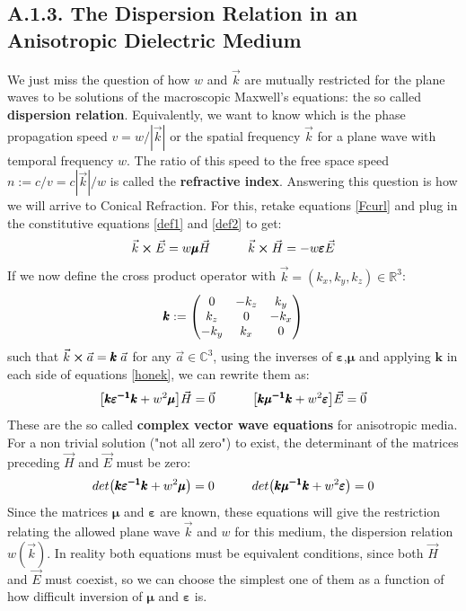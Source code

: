 \documentclass[11pt, a4paper, twoside]{article} %
\newcommand{\R}{\mathbb{R}} %
\newcommand{\C}{\mathbb{C}}
\begin{document}
\subsection*{A.1.3. The Dispersion Relation in an Anisotropic Dielectric Medium\vspace{-0.2cm}}
We just miss the question of how $w$ and $\vec{k}$ are mutually restricted for the plane waves to be solutions of the macroscopic Maxwell's equations: the so called {\bf dispersion relation}. Equivalently, we want to know which is the phase propagation speed $v=w/|\vec{k}|$ or the spatial frequency $\vec{k}$ for a plane wave with temporal frequency $w$. The ratio of this speed to the free space speed $n:=c/v=c|\vec{k}|/w$ is called the {\bf refractive index}. Answering this question is how we will arrive to Conical Refraction. For this, retake equations \eqref{Fcurl} and plug in the constitutive equations \eqref{def1} and \eqref{def2} to get:
\begin{equation}\label{honek}
\vec{k}\cross \vec{E}=w\pmb{\mu}\vec{H} \quad \quad \quad \vec{k}\cross\vec{H}=-w\pmb{\varepsilon}\vec{E}
\end{equation} 
If we now define the cross product operator with $\vec{k}=(k_x,k_y,k_z)\in\R^3$:\vspace{-0.1cm}
\begin{equation}
\pmb{k}:=\begin{pmatrix}
0& -k_z& k_y\\
k_z & 0 & -k_x\\
-k_y & k_x & 0
\end{pmatrix}\vspace{-0.1cm}
\end{equation}
such that $\vec{k}\cross\vec{a}=\pmb{k}\;\vec{a}$ for any $\vec{a}\in\C^3$, using the inverses of $\pmb{\varepsilon}$,$\pmb{\mu}$ and applying $\pmb{k}$ in each side of equations \eqref{honek}, we can rewrite them as:\vspace{-0.1cm}
\begin{equation}
\qty[\pmb{k}\pmb{\varepsilon^{-1}}\pmb{k}+w^2\pmb{\mu}]\vec{H}=\vec{0} \quad \quad \quad \qty[\pmb{k}\pmb{\mu^{-1}}\pmb{k}+w^2\pmb{\varepsilon}]\vec{E}=\vec{0}
\end{equation}
These are the so called {\bf complex vector wave equations} for anisotropic media. For a non trivial solution ("not all zero") to exist, the determinant of the matrices preceding $\vec{H}$ and $\vec{E}$ must be zero:
\begin{equation}\label{wave2}
det\qty(\pmb{k}\pmb{\varepsilon^{-1}}\pmb{k}+w^2\pmb{\mu})=0 \quad \quad\quad det\qty(\pmb{k}\pmb{\mu^{-1}}\pmb{k}+w^2\pmb{\varepsilon})=0
\end{equation}
Since the matrices $\pmb{\mu}$ and $\pmb{\varepsilon}$ are known, these equations will give the restriction relating the allowed plane wave $\vec{k}$ and $w$ for this medium, the dispersion relation $w(\vec{k})$. In reality both equations must be equivalent conditions, since both $\vec{H}$ and $\vec{E}$ must coexist, so we can choose the simplest one of them as a function of how difficult inversion of $\pmb{\mu}$ and $\pmb{\varepsilon}$ is.
\end{document}
